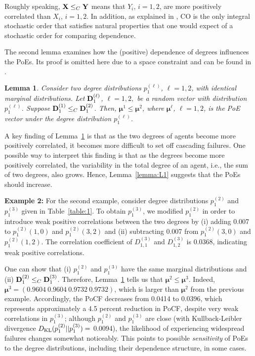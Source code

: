 \documentclass[10pt, journal, compsoc]{IEEEtran}
\newcommand {\bX} {{\bf X}}
\newcommand {\bY} {{\bf Y}}
\newcommand {\bmu} {\boldsymbol{\mu}}
\newtheorem{lemma}{Lemma}
\newcommand{\myskip}{\\ \vspace{-0.1in}}
\begin{document}
Roughly speaking, 
$\bX \leq_C \bY$ means that $Y_i$, $i = 1, 
2$, are more positively correlated than $X_i$, 
$i = 1, 2$. In addition, as explained 
in \cite[p. 109]{MullerStoyan}, CO
is the only integral stochastic order that
satisfies natural properties that one would
expect of a stochastic order for comparing
dependence. 


The second lemma examines how the (positive)
dependence of degrees influences the PoEs. 
Its proof is omitted here due to a 
space constraint and can be found in 
\cite{La_arvix}.  

\begin{lemma} \label{lemma:L2}
Consider two degree distributions $p^{(\ell)}_1$, 
$\ell = 1, 2$,
with identical marginal distributions. 
Let ${\bf D}^{(\ell)}_1$, 
$\ell = 1, 2,$ be a random vector with
distribution $p^{(\ell)}_1$. Suppose 
${\bf D}^{(1)}_1 \leq_{C} {\bf D}^{(2)}_1$. 
Then, $\bmu^{1} \leq \bmu^{2}$, where 
$\bmu^{\ell}$, 
$\ell = 1, 2$, is the PoE vector under the 
degree distribution $p^{(\ell)}_1$.
\end{lemma}


A key finding of Lemma~\ref{lemma:L2} is
that as the two degrees of agents become
more positively correlated, it becomes 
more difficult to set off cascading failures. 
One possible way to 
interpret this finding is that as the 
degrees become more positively correlated, 
the variability in the total degree of an agent, 
i.e., the sum of two degrees, also grows. 
Hence, Lemma~\ref{lemma:L1} suggests that 
the PoEs should increase.  
\myskip



{\bf Example 2: } For the second 
example, consider degree distributions 
$p^{(2)}_1$ and $p^{(3)}_1$ given in 
Table~\ref{table:1}. To obtain $p^{(3)}_1$, we 
modified $p^{(2)}_1$ in order to introduce
weak positive correlations between the two 
degrees by (i) adding 0.007 to $p^{(2)}_1(1, 0)$
and $p^{(2)}_1(3, 2)$ and (ii) subtracting 
0.007 from $p^{(2)}_1(3, 0)$ and
$p^{(2)}_1(1, 2)$. The correlation coefficient
of $D^{(3)}_{1,1}$ and $D^{(3)}_{1,2}$ is 0.0368, 
indicating weak positive correlations.

One can show that (i) $p^{(2)}_1$ and 
$p^{(3)}_1$ have the same 
marginal distributions and 
(ii) ${\bf D}^{(2)}_1 \leq_C {\bf D}^{(3)}_1$. 
Therefore, Lemma~\ref{lemma:L2} tells us
that $\bmu^2 \leq \bmu^3$. 
Indeed, $\bmu^3 = (0.9604 \ 0.9604 \ 0.9732 \ 
0.9732)$, which is larger 
than $\bmu^2$ from the previous example.
Accordingly, the PoCF 
decreases from 0.0414 to 0.0396, which 
represents approximately a 4.5 percent reduction 
in PoCF, 
despite very weak correlations in $p^{(3)}_1$;  
although $p^{(2)}_1$ and $p^{(3)}_1$ are close
(with Kullback-Leibler divergence 
$D_{{\rm KL}}(p^{(2)}_1 || p^{(3)}_1) =$ 0.0094), 
the likelihood of experiencing widespread
failures changes somewhat 
noticeably. This points
to possible {\em sensitivity} of PoEs
to the degree distributions, including
their dependence structure, 
in some cases. 
\end{document}
